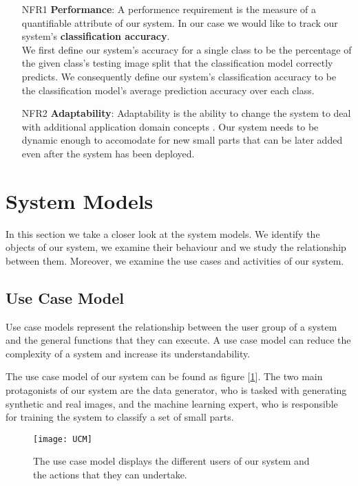 \begin{itemize}
  \item [NFR1] \textbf{Performance}: A performence requirement is the measure of a quantifiable attribute of our system. In our case we would like to track our system's \textbf{classification accuracy}.\\
  We first define our system's accuracy for a single class to be the percentage of the given class's testing image split that the classification model correctly predicts. We consequently define our system's classification accuracy to be the classification model's average prediction accuracy over each class.

  \item [NFR2] \textbf{Adaptability}: Adaptability is the ability to change the system to deal with additional application domain concepts \cite{bruegge2004object}. Our system needs to be dynamic enough to accomodate for new small parts that can be later added even after the system has been deployed.
\end{itemize}

\section{System Models}
In this section we take a closer look at the system models. We identify the objects of our system, we examine their behaviour and we study the relationship between them. Moreover, we examine the use cases and activities of our system.

\subsection{Use Case Model}

Use case models represent the relationship between the user group of a system and the general functions that they can execute. A use case model can reduce the complexity of a system and increase its understandability.

The use case model of our system can be found as figure [\ref{fig:UCM}]. The two main protagonists of our system are the data generator, who is tasked with generating synthetic and real images, and the machine learning expert, who is responsible for training the system to classify a set of small parts.

\begin{figure}[H]
\centering
  \texttt{[image: UCM]}
\caption{The use case model displays the different users of our system and the actions that they can undertake.}
\label{fig:UCM}
\end{figure}


